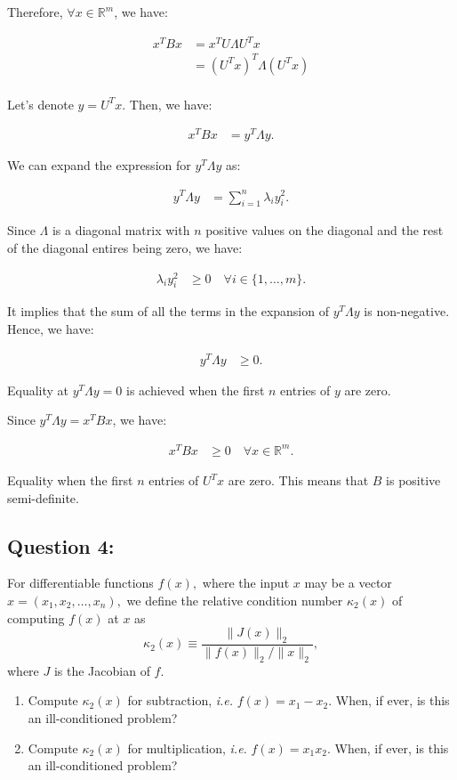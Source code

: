 \documentclass[11pt,onecolumn]{article}
\newcommand{\R}{\mathbb{R}}
\begin{document}
\begin{enumerate}
    Therefore, $\forall x \in \R^m$, we have:

    \begin{align*}
        x^TBx &= x^T U\Lambda U^T x \\
        &= (U^T x)^T \Lambda (U^T x) \\
    \end{align*}

    Let's denote $y = U^T x$. Then, we have:

    \begin{align*}
        x^TBx &= y^T \Lambda y.
    \end{align*}

    We can expand the expression for $y^T \Lambda y$ as:

    \begin{align*}
        y^T \Lambda y &= \sum_{i=1}^n \lambda_i y_i^2.
    \end{align*}

    Since $\Lambda$ is a diagonal matrix with $n$ positive values on the diagonal and the rest of the diagonal entires being zero, we have:

    \begin{align*}
        \lambda_i y_i^2 &\geq 0 \quad \forall i \in \{1, \ldots, m\}.
    \end{align*}
    
    It implies that the sum of all the terms in the expansion of $y^T \Lambda y$ is non-negative. Hence, we have:

    \begin{align*}
        y^T \Lambda y &\geq 0.
    \end{align*}

    Equality at \(y^T \Lambda y = 0\) is achieved when the first $n$ entries of \(y\) are zero.

    Since $y^T \Lambda y = x^TBx$, we have:

    \begin{align*}
        x^TBx &\geq 0 \quad \forall x \in \R^m.
    \end{align*}

    Equality when the first $n$ entries of \(U^Tx\) are zero.
    This means that $B$ is positive semi-definite.

\end{enumerate}
\subsection*{Question 4:}
For differentiable functions $f(x),$ where the input $x$ may be a vector $x = (x_1, x_2,\ldots,x_n),$ we define the relative condition number $\kappa_{2}(x)$ of computing $f(x)$ at $x$ as
\[
\kappa_{2}(x) \equiv \frac{\|J(x)\|_{2}}{\|f(x)\|_{2}/\|x\|_{2}},
\] 
where $J$ is the Jacobian of $f.$
\begin{enumerate}
\item Compute $\kappa_{2}(x)$ for subtraction, \emph{i.e.} $f(x) = x_1 - x_2.$ When, if ever, is this an ill-conditioned problem?
\item Compute $\kappa_{2}(x)$ for multiplication, \emph{i.e.} $f(x) = x_1x_2.$ When, if ever, is this an ill-conditioned problem?
\end{enumerate}
\end{document}
